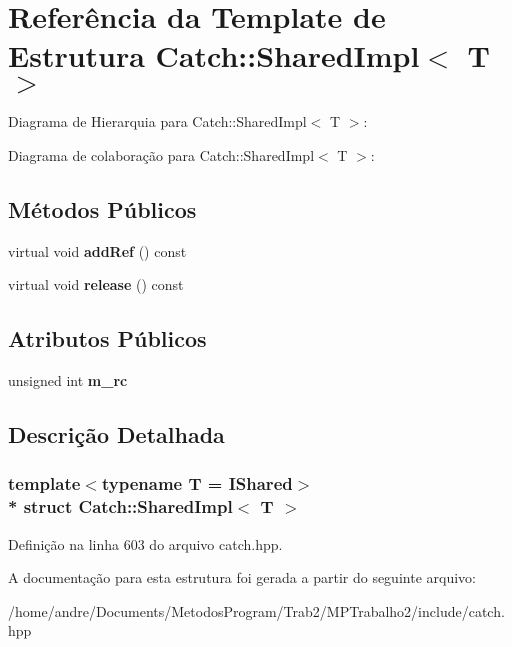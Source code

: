\hypertarget{structCatch_1_1SharedImpl}{}\section{Referência da Template de Estrutura Catch\+:\+:Shared\+Impl$<$ T $>$}
\label{structCatch_1_1SharedImpl}


Diagrama de Hierarquia para Catch\+:\+:Shared\+Impl$<$ T $>$\+:


Diagrama de colaboração para Catch\+:\+:Shared\+Impl$<$ T $>$\+:
\subsection*{Métodos Públicos}
\begin{DoxyCompactItemize}
\item 
virtual void {\bfseries add\+Ref} () const \hypertarget{structCatch_1_1SharedImpl_a9b190b7a139a09d2624d1201d8e4f87e}{}\label{structCatch_1_1SharedImpl_a9b190b7a139a09d2624d1201d8e4f87e}

\item 
virtual void {\bfseries release} () const \hypertarget{structCatch_1_1SharedImpl_a16baad80ad5ad3dfaf2a10a157a02e01}{}\label{structCatch_1_1SharedImpl_a16baad80ad5ad3dfaf2a10a157a02e01}

\end{DoxyCompactItemize}
\subsection*{Atributos Públicos}
\begin{DoxyCompactItemize}
\item 
unsigned int {\bfseries m\+\_\+rc}\hypertarget{structCatch_1_1SharedImpl_a7e71ef1985b85aa41a1632f932a96bcb}{}\label{structCatch_1_1SharedImpl_a7e71ef1985b85aa41a1632f932a96bcb}

\end{DoxyCompactItemize}


\subsection{Descrição Detalhada}
\subsubsection*{template$<$typename T = I\+Shared$>$\\*
struct Catch\+::\+Shared\+Impl$<$ T $>$}



Definição na linha 603 do arquivo catch.\+hpp.



A documentação para esta estrutura foi gerada a partir do seguinte arquivo\+:\begin{DoxyCompactItemize}
\item 
/home/andre/\+Documents/\+Metodos\+Program/\+Trab2/\+M\+P\+Trabalho2/include/catch.\+hpp\end{DoxyCompactItemize}
